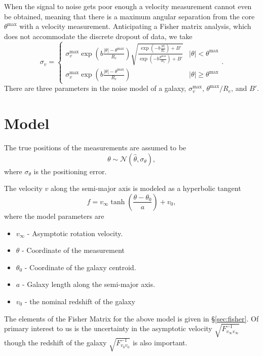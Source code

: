 \documentclass[11pt, oneside]{article}   	%
\begin{document}
When the signal to noise gets poor enough a velocity measurement cannot even be obtained, meaning that there 
is a maximum angular separation from the core $\theta^{\text{max}}$  with a velocity  measurement.  Anticipating a Fisher matrix analysis, which does not accommodate the
discrete dropout of data, we take
\begin{equation}
\sigma_v = 
	\begin{cases}
	 \sigma_v^\text{max} \exp{\left(b \frac{|\theta|-\theta^\text{max}}{R_e}\right)} \sqrt{\frac{\exp{\left(-b \frac{|\theta|}{R_e}\right)}+ B'}{\exp{\left(-b \frac{\theta^\text{max}}{R_e}\right)}+B'}} & |{\theta}| < \theta^{\text{max}}\\
	 \sigma_v^\text{max} \exp{\left(b \frac{|\theta|-\theta^\text{max}}{R_e}\right)} &  |{\theta}| \ge \theta^{\text{max}} 
	 \end{cases}.
\end{equation}
There are three parameters in the noise model of a galaxy, $\sigma_v^\text{max}$, $\theta^\text{max}/R_e$, and $B'$.


\section{Model}
The true positions of the measurements are assumed to be
\begin{equation}
\theta \sim \mathcal{N}(\hat{\theta},\sigma_\theta),
\end{equation}
where $\sigma_\theta$ is the positioning error.

The velocity $v$ along the semi-major axis is modeled as a hyperbolic tangent
\begin{equation}
f=v_\infty \tanh{\left(\frac{\theta - \theta_0}{a}\right)} + v_0,
\end{equation}
where the model parameters are
\begin{itemize}
\item $v_\infty$ - Asymptotic rotation velocity.
\item $\theta$ - Coordinate of the measurement
\item $\theta_0$ - Coordinate of the galaxy centroid. 
\item $a$ - Galaxy length along the semi-major axis.
\item $v_0$ - the nominal redshift of the galaxy
\end{itemize}


The elements of the Fisher Matrix for the above model is given in \S\ref{sec:fisher}.
Of primary interest to us is the uncertainty in the asymptotic velocity $\sqrt{F^{-1}_{v_\infty v_\infty}}$ though
the redshift of the galaxy  $\sqrt{F^{-1}_{v_0 v_0}}$ is also important.
\end{document}

